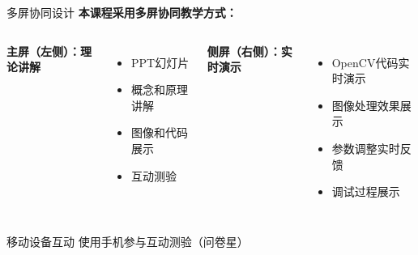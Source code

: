 \documentclass[aspectratio=169, 12pt]{beamer}
\begin{document}
\begin{frame}{多屏协同设计}
    \textbf{本课程采用多屏协同教学方式：}

    \vspace{0.3cm}

    \begin{columns}
        \textbf{主屏（左侧）：理论讲解}
        \begin{itemize}
            \item PPT幻灯片
            \item 概念和原理讲解
            \item 图像和代码展示
            \item 互动测验
        \end{itemize}

        \textbf{侧屏（右侧）：实时演示}
        \begin{itemize}
            \item OpenCV代码实时演示
            \item 图像处理效果展示
            \item 参数调整实时反馈
            \item 调试过程展示
        \end{itemize}
    \end{columns}

    \vspace{0.5cm}

    \begin{block}{移动设备互动}
        使用手机参与互动测验（问卷星）
    \end{block}
\end{frame}
\end{document}
